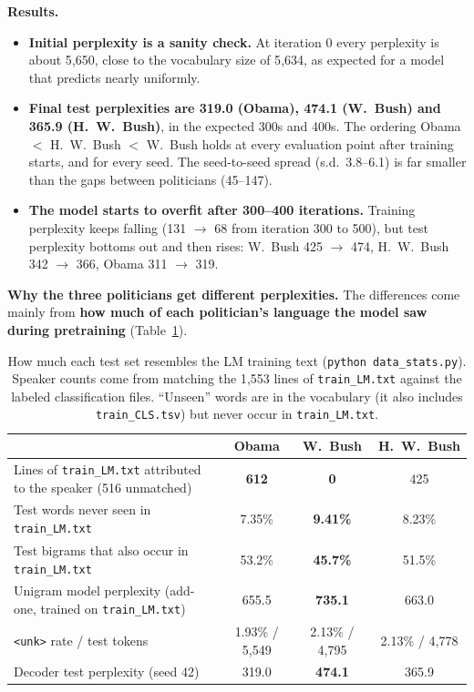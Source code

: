 \documentclass[11pt]{article}
\newcommand{\code}[1]{\texttt{#1}}
\begin{document}
\textbf{Results.}
\begin{itemize}
  \item \textbf{Initial perplexity is a sanity check.} At iteration 0 every perplexity is about 5{,}650, close to the vocabulary size of 5{,}634, as expected for a model that predicts nearly uniformly.
  \item \textbf{Final test perplexities are 319.0 (Obama), 474.1 (W.\ Bush) and 365.9 (H.\ W.\ Bush)}, in the expected 300s and 400s. The ordering Obama $<$ H.\ W.\ Bush $<$ W.\ Bush holds at every evaluation point after training starts, and for every seed. The seed-to-seed spread (s.d.\ 3.8--6.1) is far smaller than the gaps between politicians (45--147).
  \item \textbf{The model starts to overfit after 300--400 iterations.} Training perplexity keeps falling (131 $\rightarrow$ 68 from iteration 300 to 500), but test perplexity bottoms out and then rises: W.\ Bush 425 $\rightarrow$ 474, H.\ W.\ Bush 342 $\rightarrow$ 366, Obama 311 $\rightarrow$ 319.
\end{itemize}

\textbf{Why the three politicians get different perplexities.} The differences come mainly from \textbf{how much of each politician's language the model saw during pretraining} (Table~\ref{tab:data}).

\begin{table}[H]
\centering
\footnotesize
\setlength{\tabcolsep}{4pt}
\caption{How much each test set resembles the LM training text (\code{python data\_stats.py}). Speaker counts come from matching the 1{,}553 lines of \code{train\_LM.txt} against the labeled classification files. ``Unseen'' words are in the vocabulary (it also includes \code{train\_CLS.tsv}) but never occur in \code{train\_LM.txt}.}
\label{tab:data}
\begin{tabular}{@{}l ccc@{}}
\toprule
& Obama & W.\ Bush & H.\ W.\ Bush \\
\midrule
Lines of \code{train\_LM.txt} attributed to the speaker (516 unmatched) & \textbf{612} & \textbf{0} & 425 \\
Test words never seen in \code{train\_LM.txt} & 7.35\% & \textbf{9.41\%} & 8.23\% \\
Test bigrams that also occur in \code{train\_LM.txt} & 53.2\% & \textbf{45.7\%} & 51.5\% \\
Unigram model perplexity (add-one, trained on \code{train\_LM.txt}) & 655.5 & \textbf{735.1} & 663.0 \\
\code{<unk>} rate / test tokens & 1.93\% / 5{,}549 & 2.13\% / 4{,}795 & 2.13\% / 4{,}778 \\
\midrule
Decoder test perplexity (seed 42) & 319.0 & \textbf{474.1} & 365.9 \\
\bottomrule
\end{tabular}
\end{table}
\end{document}
